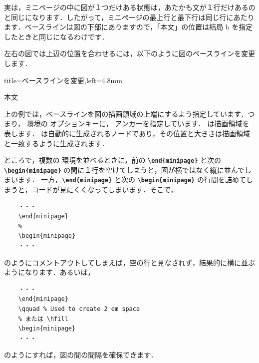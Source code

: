 \documentclass[../geometrymemo.tex]{subfiles}
\begin{document}
実は，ミニページの中に図が１つだけある状態は，あたかも文が１行だけあるのと同じになります．したがって，ミニページの最上行と最下行は同じ行にあたります．ベースラインは図の下部にありますので，「本文」の位置は結局 b を指定したときと同じになるわけです．

左右の図では上辺の位置を合わせるには，以下のように図のベースラインを変更します．
\begin{tcblisting}{title=ベースラインを変更,left=4.8mm}
    \begin{minipage}[t]{0.3\columnwidth}
        \centering
    \end{minipage}
    本文
    \begin{minipage}[t]{0.3\columnwidth}
        \centering
    \end{minipage}
\end{tcblisting}

上の例では，ベースラインを図の描画領域の上端にするよう指定しています．つまり， 環境の  オプションキーに，  アンカーを指定しています． は描画領域を表します． は自動的に生成されるノードであり，その位置と大きさは描画領域と一致するように生成されます．

ところで，複数の  環境を並べるときに，前の \textbf{\texttt{\textbackslash{}end\{minipage\}}} と次の \textbf{\texttt{\textbackslash{}begin\{minipage\}}} の間に１行を空けてしまうと，図が横ではなく縦に並んでしまいます．
一方，\textbf{\texttt{\textbackslash{}end\{minipage\}}} と次の \textbf{\texttt{\textbackslash{}begin\{minipage\}}} の行間を詰めてしまうと，コードが見にくくなってしまいます．そこで，
\begin{lstlisting}
    ・・・
    \end{minipage}
    %
    \begin{minipage}
    ・・・
\end{lstlisting}
のようにコメントアウトしてしまえば，空の行と見なされず，結果的に横に並ぶようになります．あるいは，
\begin{lstlisting}
    ・・・
    \end{minipage}
    \qquad % Used to create 2 em space
    % または \hfill
    \begin{minipage}
    ・・・
\end{lstlisting}
のようにすれば，図の間の間隔を確保できます．
\end{document}
